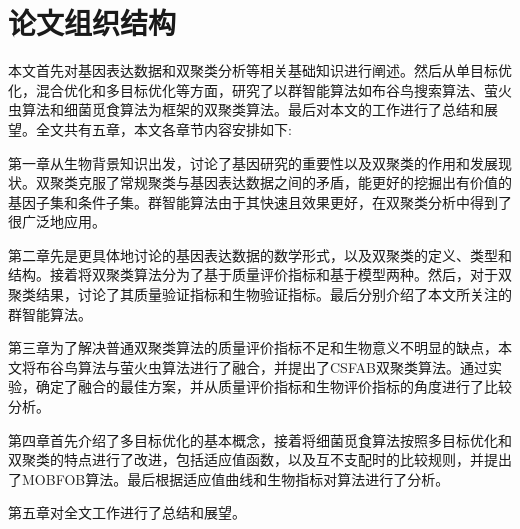 \section{论文组织结构}
    本文首先对基因表达数据和双聚类分析等相关基础知识进行阐述。然后从单目标优化，混合优化和多目标优化等方面，研究了以群智能算法如布谷鸟搜索算法、萤火虫算法和细菌觅食算法为框架的双聚类算法。最后对本文的工作进行了总结和展望。全文共有五章，本文各章节内容安排如下:

    第一章从生物背景知识出发，讨论了基因研究的重要性以及双聚类的作用和发展现状。双聚类克服了常规聚类与基因表达数据之间的矛盾，能更好的挖掘出有价值的基因子集和条件子集。群智能算法由于其快速且效果更好，在双聚类分析中得到了很广泛地应用。

    第二章先是更具体地讨论的基因表达数据的数学形式，以及双聚类的定义、类型和结构。接着将双聚类算法分为了基于质量评价指标和基于模型两种。然后，对于双聚类结果，讨论了其质量验证指标和生物验证指标。最后分别介绍了本文所关注的群智能算法。

    第三章为了解决普通双聚类算法的质量评价指标不足和生物意义不明显的缺点，本文将布谷鸟算法与萤火虫算法进行了融合，并提出了CSFAB双聚类算法。通过实验，确定了融合的最佳方案，并从质量评价指标和生物评价指标的角度进行了比较分析。

    第四章首先介绍了多目标优化的基本概念，接着将细菌觅食算法按照多目标优化和双聚类的特点进行了改进，包括适应值函数，以及互不支配时的比较规则，并提出了MOBFOB算法。最后根据适应值曲线和生物指标对算法进行了分析。
    
    第五章对全文工作进行了总结和展望。
